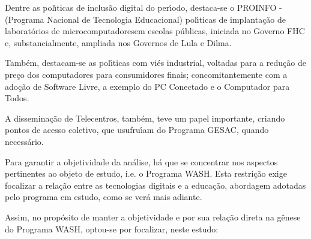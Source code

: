 \documentclass[
12pt,		%
openright,	%
twoside,  %
a4paper,			%
chapter=TITLE,		%
english,			%
french,				%
spanish,			%
brazil				%
]{USPSC-classe/USPSC}
\begin{document}
Dentre as pol\'{\i}ticas de inclus\~ao digital do per\'{\i}odo, destaca-se o  PROINFO - (Programa Nacional de Tecnologia Educacional) pol\'{\i}ticas de implanta\c{c}\~ao de \textquotedbl laborat\'orios de microcomputadores\textquotedbl  em escolas p\'ublicas, iniciada no Governo FHC e, substancialmente, ampliada nos Governos de Lula e Dilma.

















Tamb\'em, destacam-se as pol\'{\i}ticas com vi\'es industrial, voltadas para a redu\c{c}\~ao de pre\c{c}o dos computadores para consumidores finais; concomitantemente com a ado\c{c}\~ao de Software Livre, a exemplo do PC Conectado e o Computador para Todos.

















A dissemina\c{c}\~ao de Telecentros, tamb\'em, teve um papel importante, criando pontos de acesso coletivo, que usufru\'{\i}am do Programa GESAC, quando necess\'ario.

















Para garantir a objetividade da an\'alise, h\'a que se concentrar nos aspectos pertinentes ao objeto de estudo, i.e. o Programa WASH. Esta restri\c{c}\~ao exige focalizar a rela\c{c}\~ao entre as tecnologias digitais e a educa\c{c}\~ao, abordagem adotadas pelo programa em estudo, como se ver\'a mais adiante.

















Assim, no prop\'osito de manter a objetividade e por sua rela\c{c}\~ao direta na g\^enese do Programa WASH, optou-se por focalizar, neste estudo:
\end{document}
